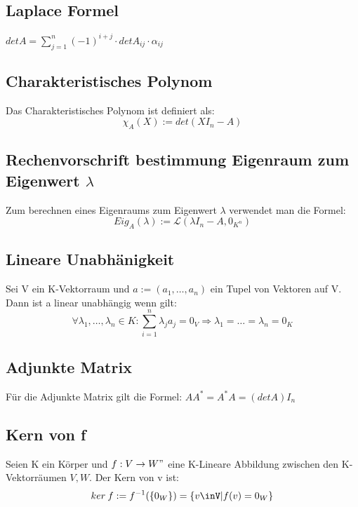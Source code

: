 \documentclass[11pt]{article}
\begin{document}
    \subsection{Laplace Formel}
    $detA=\sum\limits_{j=1}^{n}(-1)^{i+j}\cdot detA_{ij}\cdot\alpha_{ij}$
    \subsection{Charakteristisches Polynom}
    Das Charakteristisches Polynom ist definiert als:
    \[\chi_A(X):=det(XI_n-A)\]
    \subsection{Rechenvorschrift bestimmung Eigenraum zum Eigenwert $\lambda$}
    Zum berechnen eines Eigenraums zum Eigenwert $\lambda$ verwendet man die Formel:
    \[Eig_A(\lambda) := \mathcal{L}(\lambda I_n - A, 0_{K^n})\]
    \subsection{Lineare Unabhänigkeit}
    Sei V ein K-Vektorraum und $a:=(a_1,\dots,a_n)$ ein Tupel von Vektoren auf V. \newline
    Dann ist a linear unabhängig wenn gilt:
    \[
        \forall \lambda_1,\dots,\lambda_n\in K: \sum\limits_{i = 1}^{n}\lambda_ja_j=0_V\Rightarrow\lambda_1=\dots=\lambda_n=0_K
\]
    \subsection{Adjunkte Matrix}
    Für die Adjunkte Matrix gilt die Formel: $AA^*=A^*A=(detA)I_n$
    \subsection{Kern von f}
    Seien K ein Körper und $f:V\rightarrow W"$ eine K-Lineare Abbildung zwischen den K-Vektorräumen $V,W$. \newline
    Der Kern von v ist:
    \[
        ker\:f:=f^{-1}(\{0_W\})=\{v\inV | f(v)=0_W\}
    \]
\end{document}
